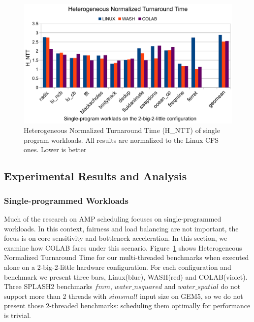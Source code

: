 \begin{figure}
\centering
\includegraphics[scale=0.45]{figures/MSW2.pdf}
\caption{Heterogeneous Normalized Turnaround Time (H\_NTT) of single program workloads.  All results are normalized to the Linux CFS ones. Lower is better}
\label{MSW}
\end{figure}  



\subsection{Experimental Results and Analysis}

\subsubsection{Single-programmed Workloads}
Much of the research on AMP scheduling focuses on single-programmed workloads. In this context, fairness and load balancing are not important, the focus is on core sensitivity and bottleneck acceleration. In this section, we examine how COLAB fares under this scenario. Figure~\ref{MSW} shows Heterogeneous Normalized Turnaround Time for our multi-threaded benchmarks when executed alone on a 2-big-2-little hardware configuration. For each configuration and benchmark we present three bars, Linux(blue), WASH(red) and COLAB(violet). 
Three SPLASH2 benchmarks $fmm$, $water\_nsquared$ and $water\_spatial$ do not support more than 2 threads with $simsmall$ input size on GEM5, so we do not present those 2-threaded benchmarks: scheduling them optimally for performance is trivial.

